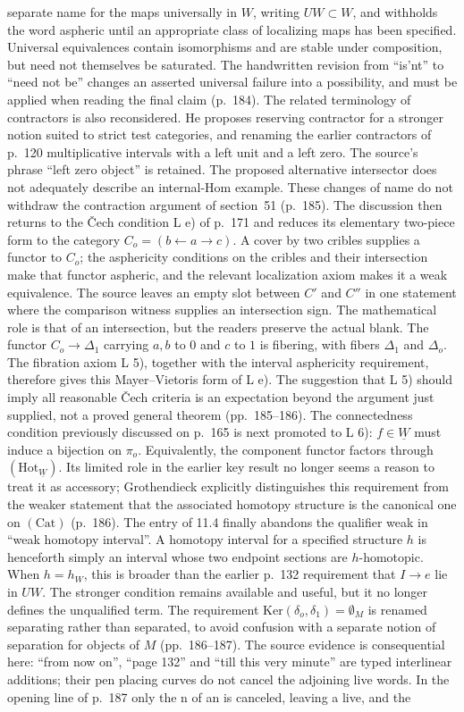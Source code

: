 \documentclass[10pt,oneside]{book}
\begin{document}
separate name for the maps universally in $W$, writing $UW\subset W$, and withholds the word aspheric until an appropriate class of localizing maps has been specified. Universal equivalences contain isomorphisms and are stable under composition, but need not themselves be saturated. The handwritten revision from ``is'nt'' to ``need not be'' changes an asserted universal failure into a possibility, and must be applied when reading the final claim (p.~184). The related terminology of contractors is also reconsidered. He proposes reserving contractor for a stronger notion suited to strict test categories, and renaming the earlier contractors of p.~120 multiplicative intervals with a left unit and a left zero. The source's phrase ``left zero object'' is retained. The proposed alternative intersector does not adequately describe an internal-Hom example. These changes of name do not withdraw the contraction argument of section~51 (p.~185). The discussion then returns to the \v Cech condition L e) of p.~171 and reduces its elementary two-piece form to the category $C_o=(b\leftarrow a\to c)$. A cover by two cribles supplies a functor to $C_o$; the asphericity conditions on the cribles and their intersection make that functor aspheric, and the relevant localization axiom makes it a weak equivalence. The source leaves an empty slot between $C'$ and $C''$ in one statement where the comparison witness supplies an intersection sign. The mathematical role is that of an intersection, but the readers preserve the actual blank. The functor $C_o\to\Delta_1$ carrying $a,b$ to $0$ and $c$ to $1$ is fibering, with fibers $\Delta_1$ and $\Delta_o$. The fibration axiom L 5), together with the interval asphericity requirement, therefore gives this Mayer--Vietoris form of L e). The suggestion that L 5) should imply all reasonable \v Cech criteria is an expectation beyond the argument just supplied, not a proved general theorem (pp.~185--186). The connectedness condition previously discussed on p.~165 is next promoted to L 6): $f\in\underline W$ must induce a bijection on $\pi_o$. Equivalently, the component functor factors through $(\mathrm{Hot}_{\underline W})$. Its limited role in the earlier key result no longer seems a reason to treat it as accessory; Grothendieck explicitly distinguishes this requirement from the weaker statement that the associated homotopy structure is the canonical one on $(\mathrm{Cat})$ (p.~186). The entry of 11.4 finally abandons the qualifier weak in ``weak homotopy interval''. A homotopy interval for a specified structure $h$ is henceforth simply an interval whose two endpoint sections are $h$-homotopic. When $h=h_W$, this is broader than the earlier p.~132 requirement that $I\to e$ lie in $UW$. The stronger condition remains available and useful, but it no longer defines the unqualified term. The requirement $\mathrm{Ker}(\delta_o,\delta_1)=\emptyset_M$ is renamed separating rather than separated, to avoid confusion with a separate notion of separation for objects of $M$ (pp.~186--187). The source evidence is consequential here: ``from now on'', ``page 132'' and ``till this very minute'' are typed interlinear additions; their pen placing curves do not cancel the adjoining live words. In the opening line of p.~187 only the n of an is canceled, leaving a live, and the 
\end{document}
